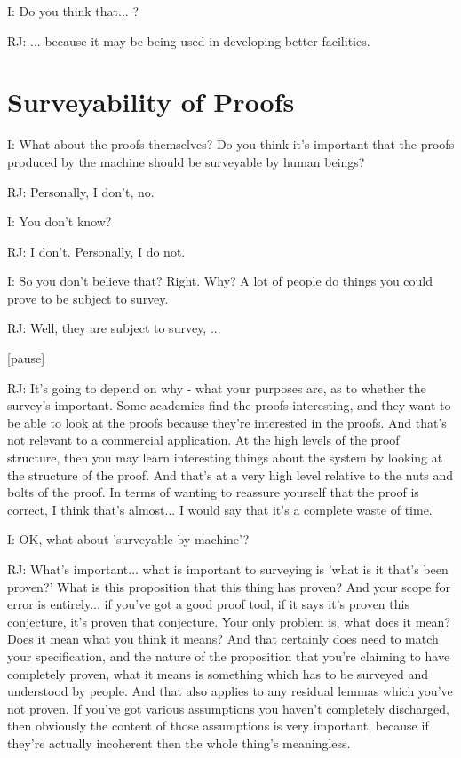\documentclass[10pt,titlepage]{book}
\begin{document}
I: Do you think that... ?

RJ: ... because it may be being used in developing better facilities.

\section{Surveyability of Proofs}

I: What about the proofs themselves?
Do you think it's important that the proofs produced by the machine should be surveyable by human beings?

RJ: Personally, I don't, no.

I: You don't know?

RJ: I don't.
Personally, I do not.

I: So you don't believe that?
Right.
Why?
A lot of people do things you could prove to be subject to survey.

RJ: Well, they are subject to survey, ... 

[pause]

RJ: It's going to depend on why - what your purposes are, as to whether the survey's important.
Some academics find the proofs interesting, and they want to be able to look at the proofs because they're interested in the proofs.
And that's not relevant to a commercial application.
At the high levels of the proof structure, then you may learn interesting things about the system by looking at the structure of the proof.
And that's at a very high level relative to the nuts and bolts of the proof.
In terms of wanting to reassure yourself that the proof is correct, I think that's almost... I would say that it's a complete waste of time.

I: OK, what about 'surveyable by machine'?

RJ: What's important... what is important to surveying is 'what is it that's been proven?' What is this proposition that this thing has proven? And your scope for error is entirely... if you've got a good proof tool, if it says it's proven this conjecture, it's proven that conjecture. Your only problem is, what does it mean? Does it mean what you think it means? And that certainly does need to match your specification, and the nature of the proposition that you're claiming to have completely proven, what it means is something which has to be surveyed and understood by people. And that also applies to any residual lemmas which you've not proven. If you've got various assumptions you haven't completely discharged, then obviously the content of those assumptions is very important, because if they're actually incoherent then the whole thing's meaningless.
\end{document}
